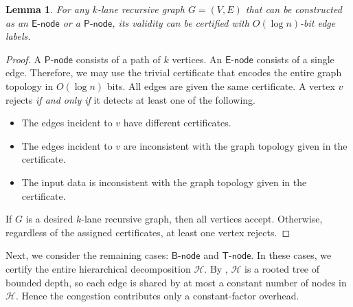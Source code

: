\documentclass[11pt]{article}
\newtheorem{lemma}{Lemma}[section]
\theoremstyle{definition}
\theoremstyle{remark}
\newcommand{\enode}{\mathsf{E}\text{-}\mathsf{node}}
\newcommand{\bnode}{\mathsf{B}\text{-}\mathsf{node}}
\newcommand{\pnode}{\mathsf{P}\text{-}\mathsf{node}}
\newcommand{\tnode}{\mathsf{T}\text{-}\mathsf{node}}
\begin{document}
\begin{lemma}\label{lem:base_case}
For any $k$-lane recursive graph $G=(V,E)$ that can be constructed as an $\enode$ or a $\pnode$, its validity can be certified with $O(\log n)$-bit edge labels. 
\end{lemma}
\begin{proof}
A $\pnode$ consists of a path of $k$ vertices. An $\enode$ consists of a single edge. Therefore, we may use the trivial certificate that encodes the entire graph topology in $O(\log n)$ bits. All edges are given the same certificate. A vertex $v$ rejects \emph{if and only if} it detects at least one of the following.
\begin{itemize}
    \item The edges incident to $v$ have different certificates.
    \item The edges incident to $v$ are inconsistent with the graph topology given in the certificate.
    \item The input data is inconsistent with the graph topology given in the certificate.
\end{itemize}
If $G$ is a desired $k$-lane recursive graph, then all vertices accept. Otherwise, regardless of the assigned certificates, at least one vertex rejects.
\end{proof}


Next, we consider the remaining cases: $\bnode$ and $\tnode$. In these cases, we certify the entire hierarchical decomposition $\mathcal{H}$. By , $\mathcal{H}$ is a rooted tree of bounded depth, so each edge is shared by at most a constant number of nodes in $\mathcal{H}$. Hence the congestion contributes only a constant-factor overhead. 
\end{document}
